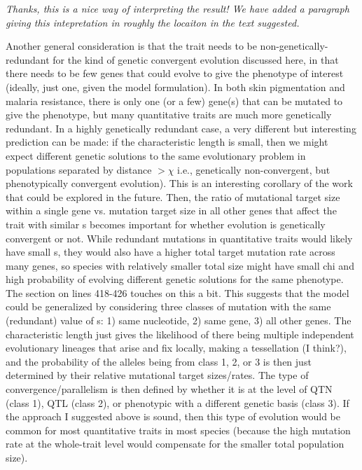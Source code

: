 \documentclass[12pt,letterpaper]{article}
\newcommand{\gc}[1]{{ \color{red} #1}}
\newcommand{\plr}[1]{{ \color{green} #1}}
\newcommand{\response}[1]{\emph{ \color{blue} #1}}
\begin{document}
\response{Thanks, this is a nice way of interpreting the result! We have added a paragraph giving this intepretation in roughly the locaiton in the text suggested.}



Another general consideration is that the trait needs to be non-genetically-redundant for the kind of genetic convergent evolution discussed here, in that there needs to be few genes that could evolve to give the phenotype of interest (ideally, just one, given the model formulation). In both skin pigmentation and malaria resistance, there is only one (or a few) gene(s) that can be mutated to give the phenotype, but many quantitative traits are much more genetically redundant. In a highly genetically redundant case, a very different but interesting prediction can be made: if the characteristic length is small, then we might expect different genetic solutions to the same evolutionary problem in populations separated by distance $> \chi$ i.e., genetically non-convergent, but phenotypically convergent evolution). This is an interesting corollary of the work that could be explored in the future. Then, the ratio of {mutational target size within a single gene} vs. {mutation target size in all other genes that affect the trait with similar s} becomes important for whether evolution is genetically convergent or not. While redundant mutations in quantitative traits would likely have small s, they would also have a higher total target mutation rate across many genes, so species with relatively smaller total size might have small chi and high probability of evolving different genetic solutions for the same phenotype. The section on lines 418-426 touches on this a bit. This suggests that the model could be generalized by considering three classes of mutation with the same (redundant) value of s: 1) same nucleotide, 2) same gene, 3) all other genes. The characteristic length just gives the likelihood of there being multiple independent evolutionary lineages that arise and fix locally, making a tessellation (I think?), and the probability of the alleles being from class 1, 2, or 3 is then just determined by their relative mutational target sizes/rates. The type of convergence/parallelism is then defined by whether it is at the level of QTN (class 1), QTL (class 2), or phenotypic with a different genetic basis (class 3). If the approach I suggested above is sound, then this type of evolution would be common for most quantitative traits in most species (because the high mutation rate at the whole-trait level would compensate for the smaller total population size).
\end{document}
